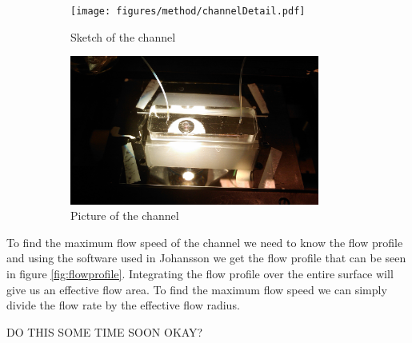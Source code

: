\begin{figure}[H]
\centering
\begin{subfigure}[b]{0.45\textwidth}
\texttt{[image: figures/method/channelDetail.pdf]}
\caption{Sketch of the channel}\label{fig:channelsketch}
\end{subfigure}
\begin{subfigure}[b]{0.45\textwidth}
\includegraphics[width=0.9\textwidth]{figures/method/ChannelZoomed.jpg}
\caption{Picture of the channel}\label{fig:channelpicture}
\end{subfigure}
\caption{}
\label{fig:channel}
\end{figure}


To find the maximum flow speed of the channel we need to know the flow profile and using the software used in Johansson \cite{AntonThesis} we get the flow profile that can be seen in figure \ref{fig:flowprofile}. Integrating the flow profile over the entire surface will give us an effective flow area. To find the maximum flow speed we can simply divide the flow rate by the effective flow radius.

DO THIS SOME TIME SOON OKAY?










